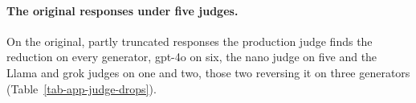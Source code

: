 \paragraph{The original responses under five judges.}
On the original, partly truncated responses the production judge finds
the reduction on every generator, gpt-4o on six, the nano judge on five and
the Llama and grok judges on one and two, those two reversing it on three
generators (Table~\ref{tab-app-judge-drops}).
